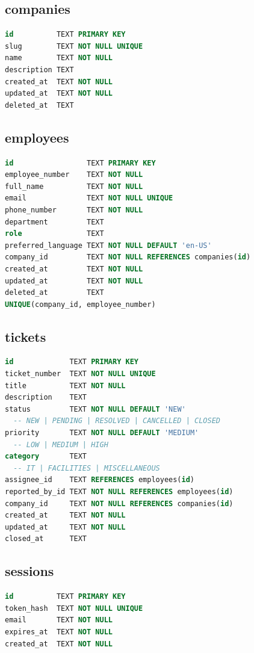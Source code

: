 \documentclass{article}
\begin{document}
\subsection{companies}
\begin{lstlisting}[language=SQL]
id          TEXT PRIMARY KEY
slug        TEXT NOT NULL UNIQUE
name        TEXT NOT NULL
description TEXT
created_at  TEXT NOT NULL
updated_at  TEXT NOT NULL
deleted_at  TEXT
\end{lstlisting}

\subsection{employees}
\begin{lstlisting}[language=SQL]
id                 TEXT PRIMARY KEY
employee_number    TEXT NOT NULL
full_name          TEXT NOT NULL
email              TEXT NOT NULL UNIQUE
phone_number       TEXT NOT NULL
department         TEXT
role               TEXT
preferred_language TEXT NOT NULL DEFAULT 'en-US'
company_id         TEXT NOT NULL REFERENCES companies(id)
created_at         TEXT NOT NULL
updated_at         TEXT NOT NULL
deleted_at         TEXT
UNIQUE(company_id, employee_number)
\end{lstlisting}

\subsection{tickets}
\begin{lstlisting}[language=SQL]
id             TEXT PRIMARY KEY
ticket_number  TEXT NOT NULL UNIQUE
title          TEXT NOT NULL
description    TEXT
status         TEXT NOT NULL DEFAULT 'NEW'
  -- NEW | PENDING | RESOLVED | CANCELLED | CLOSED
priority       TEXT NOT NULL DEFAULT 'MEDIUM'
  -- LOW | MEDIUM | HIGH
category       TEXT
  -- IT | FACILITIES | MISCELLANEOUS
assignee_id    TEXT REFERENCES employees(id)
reported_by_id TEXT NOT NULL REFERENCES employees(id)
company_id     TEXT NOT NULL REFERENCES companies(id)
created_at     TEXT NOT NULL
updated_at     TEXT NOT NULL
closed_at      TEXT
\end{lstlisting}

\subsection{sessions}
\begin{lstlisting}[language=SQL]
id          TEXT PRIMARY KEY
token_hash  TEXT NOT NULL UNIQUE
email       TEXT NOT NULL
expires_at  TEXT NOT NULL
created_at  TEXT NOT NULL
\end{lstlisting}
\end{document}

